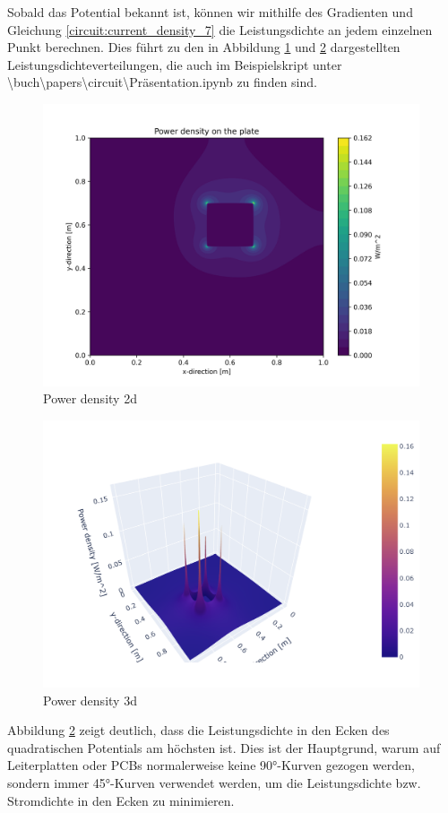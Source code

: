 Sobald das Potential bekannt ist, können wir mithilfe des Gradienten und Gleichung \ref{circuit:current_density_7} die Leistungsdichte an jedem einzelnen Punkt berechnen. Dies führt zu den in Abbildung \ref{fig:power_2d} und \ref{fig:power_3d} dargestellten Leistungsdichteverteilungen, die auch im Beispielskript unter \glqq{}\textbackslash buch\textbackslash papers\textbackslash circuit\textbackslash Präsentation.ipynb\grqq{}  zu finden sind.
\begin{figure}[h]
	\centering
	\includegraphics[width=0.99\textwidth]{papers/circuit/power_distribution.png}
	\caption{Power density 2d}
	\label{fig:power_2d}
\end{figure}
\begin{figure}[h]
	\centering
	\includegraphics[width=0.99\textwidth]{papers/circuit/3d.png}
	\caption{Power density 3d}
	\label{fig:power_3d}
\end{figure}
Abbildung \ref{fig:power_3d} zeigt deutlich, dass die Leistungsdichte in den Ecken des quadratischen Potentials am höchsten ist. Dies ist der Hauptgrund, warum auf Leiterplatten oder PCBs normalerweise keine 90°-Kurven gezogen werden, sondern immer 45°-Kurven verwendet werden, um die Leistungsdichte bzw. Stromdichte in den Ecken zu minimieren.

